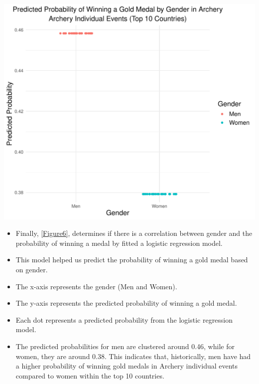 \documentclass[12pt,preprint, authoryear]{elsarticle}
\let\origfigure\figure
\let\endorigfigure\endfigure
\renewenvironment{figure}[1][2] {
    \expandafter\origfigure\expandafter[H]
} {
    \endorigfigure
}
\numberwithin{equation}{section}
\numberwithin{figure}{section}
\numberwithin{table}{section}
\begin{document}
\begin{figure}

{\centering \includegraphics{README_files/figure-latex/unnamed-chunk-7-1} 

}

\caption{The Top Countries that Dominate in both the Summer and Winter Olympics\label{Figure7}}\label{fig:unnamed-chunk-7}
\end{figure}

\begin{itemize}
\item
  Finally, \ref{Figure6}, determines if there is a correlation between
  gender and the probability of winning a medal by fitted a logistic
  regression model.
\item
  This model helped us predict the probability of winning a gold medal
  based on gender.
\item
  The x-axis represents the gender (Men and Women).
\item
  The y-axis represents the predicted probability of winning a gold
  medal.
\item
  Each dot represents a predicted probability from the logistic
  regression model.
\item
  The predicted probabilities for men are clustered around 0.46, while
  for women, they are around 0.38. This indicates that, historically,
  men have had a higher probability of winning gold medals in Archery
  individual events compared to women within the top 10 countries.
\end{itemize}


\end{document}
